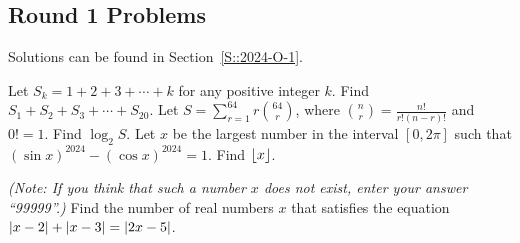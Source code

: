 \subsection{Round 1 Problems}

Solutions can be found in Section~\ref{S::2024-O-1}.

\begin{enumerate}
    \hyperrefitem[Q::2024-O-1-1] Let $S_k = 1 + 2 + 3 + \cdots + k$ for any positive integer $k$. Find $S_1 + S_2 + S_3 + \cdots + S_{20}$.
    \hyperrefitem[Q::2024-O-1-2] Let $S = \sum_{r=1}^{64} r\binom{64}{r}$, where $\binom{n}{r} = \frac{n!}{r! (n-r)!}$ and $0! = 1$. Find $\log_2 S$.
    \hyperrefitem[Q::2024-O-1-3] Let $x$ be the largest number in the interval $[0, 2\pi]$ such that $(\sin x)^{2024} - (\cos x)^{2024} = 1$. Find $\left\lfloor x \right\rfloor$.

    \textit{(Note: If you think that such a number $x$ does not exist, enter your answer ``99999''.)}
    \hyperrefitem[Q::2024-O-1-4] Find the number of real numbers $x$ that satisfies the equation $\left\lvert x - 2 \right\rvert + \left\lvert x - 3 \right\rvert = \left\lvert 2x - 5 \right\rvert$.


\end{enumerate}
